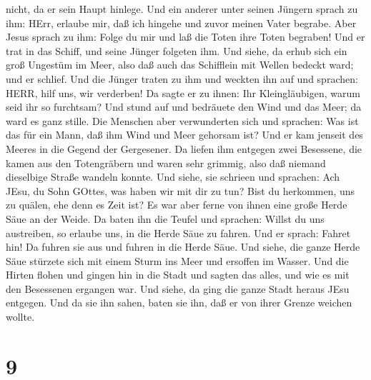 nicht, da er sein Haupt hinlege.  Und ein anderer unter
seinen Jüngern sprach zu ihm: HErr, erlaube mir, daß ich hingehe und
zuvor meinen Vater begrabe.  Aber Jesus sprach zu ihm:
Folge du mir und laß die Toten ihre Toten begraben!  Und er
trat in das Schiff, und seine Jünger folgeten ihm.  Und
siehe, da erhub sich ein groß Ungestüm im Meer, also daß auch das
Schifflein mit Wellen bedeckt ward; und er schlief.  Und
die Jünger traten zu ihm und weckten ihn auf und sprachen: HERR, hilf
uns, wir verderben!  Da sagte er zu ihnen: Ihr
Kleingläubigen, warum seid ihr so furchtsam? Und stund auf und bedräuete
den Wind und das Meer; da ward es ganz stille.  Die
Menschen aber verwunderten sich und sprachen: Was ist das für ein Mann,
daß ihm Wind und Meer gehorsam ist?  Und er kam jenseit des
Meeres in die Gegend der Gergesener. Da liefen ihm entgegen zwei
Besessene, die kamen aus den Totengräbern und waren sehr grimmig, also
daß niemand dieselbige Straße wandeln konnte.  Und siehe,
sie schrieen und sprachen: Ach JEsu, du Sohn GOttes, was haben wir mit
dir zu tun? Bist du herkommen, uns zu quälen, ehe denn es Zeit ist?
 Es war aber ferne von ihnen eine große Herde Säue an der
Weide.  Da baten ihn die Teufel und sprachen: Willst du uns
austreiben, so erlaube uns, in die Herde Säue zu fahren. 
Und er sprach: Fahret hin! Da fuhren sie aus und fuhren in die Herde
Säue. Und siehe, die ganze Herde Säue stürzete sich mit einem Sturm ins
Meer und ersoffen im Wasser.  Und die Hirten flohen und
gingen hin in die Stadt und sagten das alles, und wie es mit den
Besessenen ergangen war.  Und siehe, da ging die ganze
Stadt heraus JEsu entgegen. Und da sie ihn sahen, baten sie ihn, daß er
von ihrer Grenze weichen wollte.

\hypertarget{section-8}{%
\section{9}\label{section-8}}

